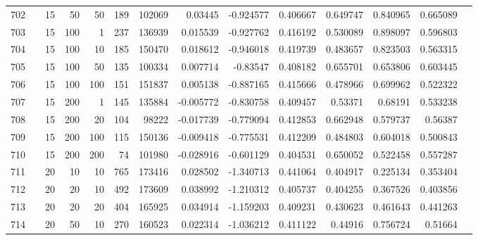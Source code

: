 \begin{longtable}{llrrrrrrrrrrrr}
		702 & &           15 &                50 &           50 &         189 &     102069 &   0.03445 & -0.924577 &  0.406667 &    0.649747 &       0.840965 &  0.665089 \\
		703 & &           15 &               100 &            1 &         237 &     136939 &  0.015539 & -0.927762 &  0.416192 &    0.530089 &       0.898097 &  0.596803 \\
		704 & &           15 &               100 &           10 &         185 &     150470 &  0.018612 & -0.946018 &  0.419739 &    0.483657 &       0.823503 &  0.563315 \\
		705 & &           15 &               100 &           50 &         135 &     100334 &  0.007714 &  -0.83547 &  0.408182 &    0.655701 &       0.653806 &  0.603445 \\
		706 & &           15 &               100 &          100 &         151 &     151837 &  0.005138 & -0.887165 &  0.415666 &    0.478966 &       0.699962 &  0.522322 \\
		707 & &           15 &               200 &            1 &         145 &     135884 & -0.005772 & -0.830758 &  0.409457 &     0.53371 &        0.68191 &  0.533238 \\
		708 & &           15 &               200 &           20 &         104 &      98222 & -0.017739 & -0.779094 &  0.412853 &    0.662948 &       0.579737 &   0.56387 \\
		709 & &           15 &               200 &          100 &         115 &     150136 & -0.009418 & -0.775531 &  0.412209 &    0.484803 &       0.604018 &  0.500843 \\
		710 & &           15 &               200 &          200 &          74 &     101980 & -0.028916 & -0.601129 &  0.404531 &    0.650052 &       0.522458 &  0.557287 \\
		711 & &           20 &                10 &           10 &         765 &     173416 &  0.028502 & -1.340713 &  0.441064 &    0.404917 &       0.225134 &  0.353404 \\
		712 & &           20 &                20 &           10 &         492 &     173609 &  0.038992 & -1.210312 &  0.405737 &    0.404255 &       0.367526 &  0.403856 \\
		713 & &           20 &                20 &           20 &         404 &     165925 &  0.034914 & -1.159203 &  0.409231 &    0.430623 &       0.461643 &  0.441263 \\
		714 & &           20 &                50 &           10 &         270 &     160523 &  0.022314 & -1.036212 &  0.411122 &     0.44916 &       0.756724 &   0.51664 \\

\end{longtable}
